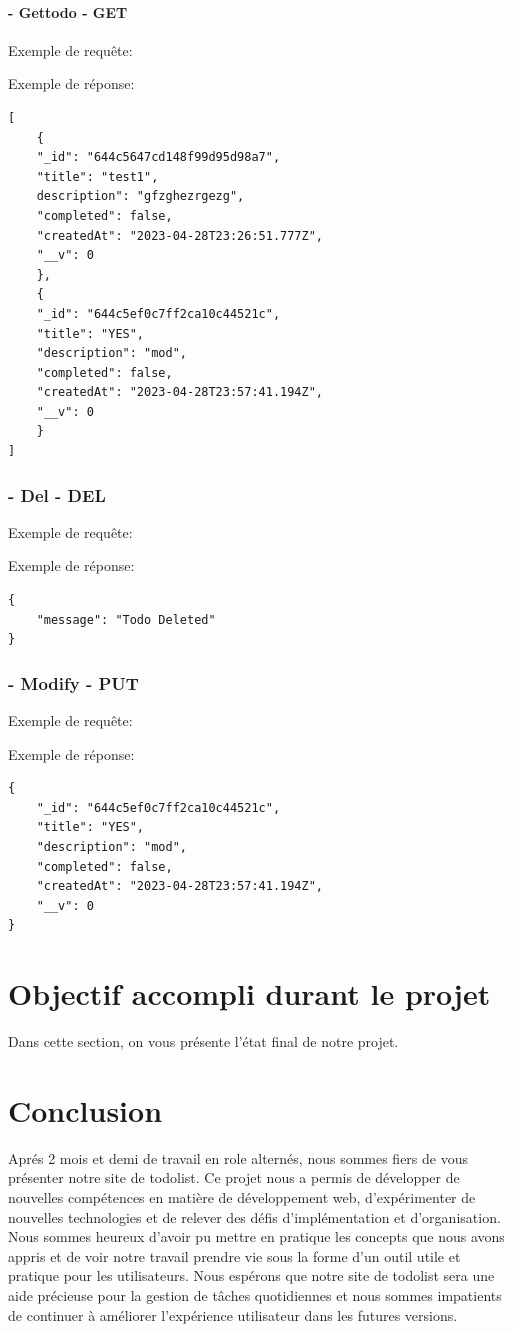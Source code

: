 \documentclass[a4paper,12pt]{report}
\begin{document}
\subsubsection{- Gettodo - GET}
Exemple de requête:


Exemple de réponse:
\begin{lstlisting}
[
	{
	"_id": "644c5647cd148f99d95d98a7",
	"title": "test1",
	description": "gfzghezrgezg",
	"completed": false,
	"createdAt": "2023-04-28T23:26:51.777Z",
	"__v": 0
	},
	{
	"_id": "644c5ef0c7ff2ca10c44521c",
	"title": "YES",
	"description": "mod",
	"completed": false,
	"createdAt": "2023-04-28T23:57:41.194Z",
	"__v": 0
	}
]
\end{lstlisting}

\subsection{- Del - DEL}
Exemple de requête:

Exemple de réponse:
\begin{lstlisting}
{
	"message": "Todo Deleted"
}
\end{lstlisting}

\subsection{- Modify - PUT}
Exemple de requête:

Exemple de réponse:
\begin{lstlisting}
{
	"_id": "644c5ef0c7ff2ca10c44521c",
	"title": "YES",
	"description": "mod",
	"completed": false,
	"createdAt": "2023-04-28T23:57:41.194Z",
	"__v": 0
}
\end{lstlisting}

\chapter{Objectif accompli durant le projet}

Dans cette section, on vous présente l'état final de notre projet.



\chapter{Conclusion}
Aprés 2 mois et demi de travail en role alternés, nous sommes fiers de vous présenter notre site de todolist.
Ce projet nous a permis de développer de nouvelles compétences en matière de développement web,
d'expérimenter de nouvelles technologies et de relever des défis d'implémentation et d'organisation.
Nous sommes heureux d'avoir pu mettre en pratique les concepts que nous avons appris et de voir 
notre travail prendre vie sous la forme d'un outil utile et pratique pour les utilisateurs. 
Nous espérons que notre site de todolist sera une aide précieuse pour la gestion de tâches quotidiennes et nous
sommes impatients de continuer à améliorer l'expérience utilisateur dans les futures versions.
\end{document}
